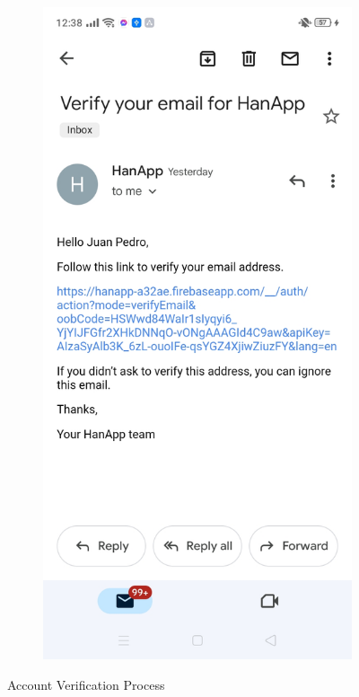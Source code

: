 \begin{figure}[!h]
\begin{subfigure}[c]{0.30\linewidth}
    \end{subfigure}
    \centering
    \begin{subfigure}[c]{0.30\linewidth}
        \centering
        \includegraphics[scale=0.15]{figures/Chapter4/Main/Verification-3.jpg}
    \end{subfigure}
    \caption{Account Verification Process}
    \label{fig:accountVerification}
\end{figure}

